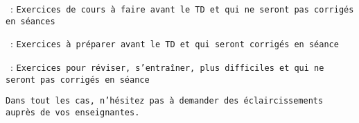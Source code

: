 
\soft~: \texttt{Exercices de cours à faire avant le TD et qui ne seront pas corrigés en séances}


\medium~: \texttt{Exercices à préparer avant le TD et qui seront corrigés en séance}


\hard~: \texttt{Exercices pour réviser, s'entraîner, plus difficiles et qui ne seront pas corrigés en séance}

\vspace{0.2cm}

\texttt{Dans tout les cas, n'hésitez pas à demander des éclaircissements auprès de vos enseignant\textperiodcentered e\textperiodcentered s.}
